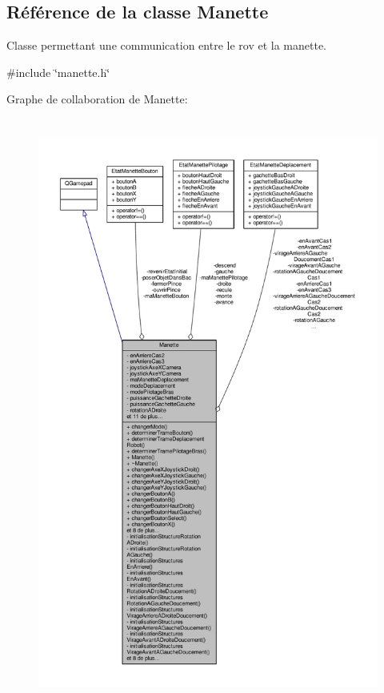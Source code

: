 \hypertarget{class_manette}{}\subsection{Référence de la classe Manette}
\label{class_manette}


Classe permettant une communication entre le rov et la manette.  




{\ttfamily \#include \char`\"{}manette.\+h\char`\"{}}



Graphe de collaboration de Manette\+:
\nopagebreak
\begin{figure}[H]
\begin{center}
\leavevmode
\includegraphics[height=550pt]{class_manette__coll__graph}
\end{center}
\end{figure}
